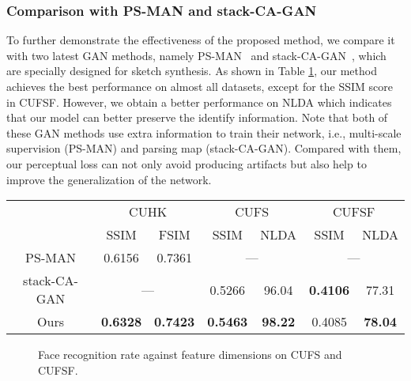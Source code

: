\documentclass[runningheads]{llncs}
\begin{document}
\subsubsection{Comparison with PS-MAN and stack-CA-GAN} To further demonstrate the effectiveness of the proposed method, we compare it with two latest GAN methods, namely PS-MAN~\cite{Wang2017psman} and stack-CA-GAN~\cite{Gao2017cagan}, which are specially designed for sketch synthesis. As shown in Table \ref{fig:ps-ca-gan}, our method achieves the best performance on almost all datasets, except for the SSIM score in CUFSF. However, we obtain a better performance on NLDA which indicates that our model can better preserve the identify information. Note that both of these GAN methods use extra information to train their network, i.e., multi-scale supervision (PS-MAN) and parsing map (stack-CA-GAN). Compared with them, our perceptual loss can not only avoid producing artifacts but also help to improve the generalization of the network.

\begin{table}[htbp]
  \centering
  \renewcommand{\arraystretch}{1}
  \label{fig:ps-ca-gan}
  \begin{tabular}{c|c|c|c|c|c|c}
    \hline
    \multirow{2}{*}{} & \multicolumn{2}{c|}{CUHK} & \multicolumn{2}{c|}{CUFS} & \multicolumn{2}{c}{CUFSF} \\ \cline{2-7}
    & SSIM      & FSIM    & SSIM  & NLDA  & SSIM  & NLDA \\ \hline
    PS-MAN  & 0.6156  & 0.7361&  \multicolumn{2}{c|}{---} & \multicolumn{2}{c}{---} \\ \hline
    stack-CA-GAN & \multicolumn{2}{c|}{---} & 0.5266  & 96.04 & \textbf{0.4106} & 77.31 \\ \hline
    Ours       & \textbf{0.6328}   & \textbf{0.7423}& \textbf{0.5463} & \textbf{98.22} & 0.4085 & \textbf{78.04}  \\ \hline
    \end{tabular}
\end{table}

\begin{figure}[htbp]
\begin{center}
\end{center}
   \caption{Face recognition rate against feature dimensions on CUFS and CUFSF.}
   \label{fig:nlda-score}
\end{figure}
\end{document}
